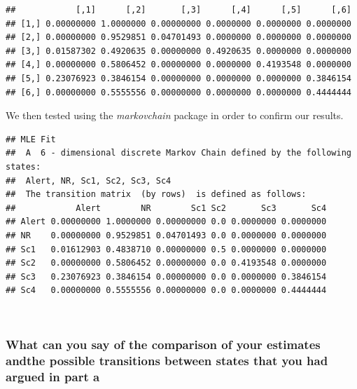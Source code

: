 \documentclass[]{article}
\newenvironment{Shaded}{\begin{snugshade}}{\end{snugshade}}
\newcommand{\DecValTok}[1]{\textcolor[rgb]{0.00,0.00,0.81}{#1}}
\newcommand{\KeywordTok}[1]{\textcolor[rgb]{0.13,0.29,0.53}{\textbf{#1}}}
\newcommand{\NormalTok}[1]{#1}
\newcommand{\OperatorTok}[1]{\textcolor[rgb]{0.81,0.36,0.00}{\textbf{#1}}}
\newcommand{\StringTok}[1]{\textcolor[rgb]{0.31,0.60,0.02}{#1}}
\begin{document}
\begin{verbatim}
##            [,1]      [,2]       [,3]      [,4]      [,5]      [,6]
## [1,] 0.00000000 1.0000000 0.00000000 0.0000000 0.0000000 0.0000000
## [2,] 0.00000000 0.9529851 0.04701493 0.0000000 0.0000000 0.0000000
## [3,] 0.01587302 0.4920635 0.00000000 0.4920635 0.0000000 0.0000000
## [4,] 0.00000000 0.5806452 0.00000000 0.0000000 0.4193548 0.0000000
## [5,] 0.23076923 0.3846154 0.00000000 0.0000000 0.0000000 0.3846154
## [6,] 0.00000000 0.5555556 0.00000000 0.0000000 0.0000000 0.4444444
\end{verbatim}

\newpage

We then tested using the \emph{markovchain} package in order to confirm
our results.

\begin{Shaded}
\end{Shaded}

\begin{verbatim}
## MLE Fit 
##  A  6 - dimensional discrete Markov Chain defined by the following states: 
##  Alert, NR, Sc1, Sc2, Sc3, Sc4 
##  The transition matrix  (by rows)  is defined as follows: 
##            Alert        NR        Sc1 Sc2       Sc3       Sc4
## Alert 0.00000000 1.0000000 0.00000000 0.0 0.0000000 0.0000000
## NR    0.00000000 0.9529851 0.04701493 0.0 0.0000000 0.0000000
## Sc1   0.01612903 0.4838710 0.00000000 0.5 0.0000000 0.0000000
## Sc2   0.00000000 0.5806452 0.00000000 0.0 0.4193548 0.0000000
## Sc3   0.23076923 0.3846154 0.00000000 0.0 0.0000000 0.3846154
## Sc4   0.00000000 0.5555556 0.00000000 0.0 0.0000000 0.4444444
\end{verbatim}

~

\hypertarget{what-can-you-say-of-the-comparison-of-your-estimates-andthe-possible-transitions-between-states-that-you-had-argued-in-part-a}{%
\subsubsection{What can you say of the comparison of your estimates
andthe possible transitions between states that you had argued in part
a}\label{what-can-you-say-of-the-comparison-of-your-estimates-andthe-possible-transitions-between-states-that-you-had-argued-in-part-a}}
\end{document}

